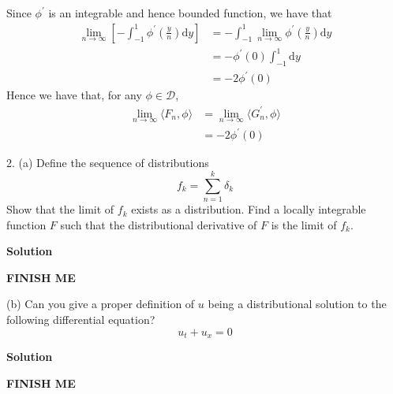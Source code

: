 \documentclass{article}
\begin{document}
%
Since $\phi^\prime$ is an integrable and hence bounded function, we have that
%
\begin{align*}
    \lim_{n \to \infty} \left[ - \int_{-1}^{1} \phi^\prime\left(\frac{y}{n}\right) \mathrm{d} y \right]
        &= - \int_{-1}^{1} \lim_{n \to \infty} \phi^\prime\left(\frac{y}{n}\right) \mathrm{d} y \\
        &= - \phi^\prime(0) \int_{-1}^{1} \mathrm{d} y \\
        &= -2 \phi^\prime(0)
\end{align*}
%
Hence we have that, for any $\phi \in \mathcal{D}$,
%
\begin{align*}
    \lim_{n \to \infty} \langle F_n, \phi \rangle
        &= \lim_{n \to \infty} \langle G_n^\prime, \phi \rangle \\
        &= -2 \phi^\prime(0)
\end{align*}

\newpage

2. (a) Define the sequence of distributions
%
\begin{equation*}
    f_k = \sum_{n = 1}^k \delta_k
\end{equation*}
%
Show that the limit of $f_k$ exists as a distribution. Find a locally
integrable function $F$ such that the distributional derivative of $F$
is the limit of $f_k$.

\textbf{Solution}

\textbf{FINISH ME}

\vspace{5mm}

(b) Can you give a proper definition of $u$ being a distributional
solution to the following differential equation?
%
\begin{equation*}
    u_t + u_x = 0
\end{equation*}

\textbf{Solution}

\textbf{FINISH ME}
\end{document}
